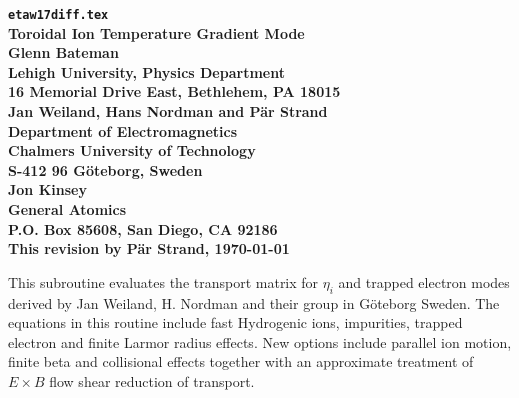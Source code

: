 \headheight 0pt \headsep 0pt          
\topmargin 0pt  \textheight 9.0in
\oddsidemargin 0pt \textwidth 6.5in

\newcommand{\Partial}[2]{\frac{\partial #1}{\partial #2}}
\newcommand{\jacobian}{{\cal J}}



\begin{center} 
{\bf {\tt etaw17diff.tex} \\
Toroidal Ion Temperature Gradient Mode  \\
\vspace{1pc}
Glenn Bateman \\
Lehigh University, Physics Department \\
16 Memorial Drive East, Bethlehem, PA 18015 \\
\vspace{1pc}
Jan Weiland, Hans Nordman and P{\"a}r Strand\\
Department of Electromagnetics \\
Chalmers University of Technology \\
S-412 96 G\"{o}teborg, Sweden \\
\vspace{1pc}
Jon Kinsey \\
General Atomics \\
P.O. Box 85608, San Diego, CA 92186} \\ 
\vspace{1pc}
{\bf This revision by P{\"a}r Strand, \today} 
\date{}
\end{center}
This subroutine evaluates the transport matrix for $\eta_i$ and trapped 
electron modes derived by Jan Weiland, H. Nordman and their group in 
G\"{o}teborg Sweden.
The equations in this routine include fast Hydrogenic ions, impurities, 
trapped electron and finite Larmor radius effects. New options include 
parallel ion motion, finite beta and collisional effects together with an 
approximate treatment of $E\times B$ flow shear reduction of transport.

